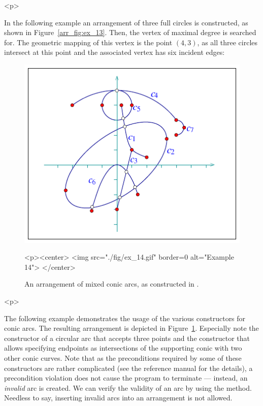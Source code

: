 \begin{ccHtmlOnly}<p>\end{ccHtmlOnly}
In the following example an arrangement of three full circles is
constructed, as shown in Figure~\ref{arr_fig:ex_13}. Then, the vertex
of maximal degree is searched for. The geometric mapping of this
vertex is the point $(4,3)$, as all three circles intersect at this point
and the associated vertex has six incident edges:


\begin{figure}[!htp]
\begin{ccTexOnly}
  \begin{center}
  \includegraphics{Arrangement_2/fig/ex_14}
  \end{center}
\end{ccTexOnly}
\begin{ccHtmlOnly}
  <p><center>
  <img src="./fig/ex_14.gif" border=0 alt="Example 14">
  </center>
\end{ccHtmlOnly}
\caption{An arrangement of mixed conic arcs, as constructed in
.}
\label{arr_fig:ex_14}
\end{figure}

\begin{ccHtmlOnly}<p>\end{ccHtmlOnly}
The following example demonstrates the usage of the various
constructors for conic arcs. The resulting arrangement is depicted
in Figure~\ref{arr_fig:ex_14}. Especially note the constructor of a
circular arc that accepts three points and the constructor that
allows specifying endpoints as intersections of the supporting
conic with two other conic curves. Note that as the preconditions
required by some of these constructors are rather complicated (see
the reference manual for the details), a precondition violation
does not cause the program to terminate --- instead, an {\em
invalid} arc is created. We can verify the validity of an arc by
using the  method. Needless to say, inserting
invalid arcs into an arrangement is not allowed.

